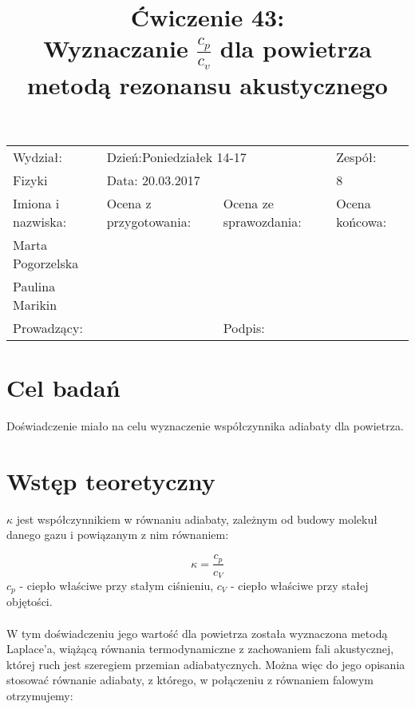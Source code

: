 \documentclass[a4paper,10pt]{article}
\def\arraystretch{1.2}
\begin{document}
\begin{table}
  \centering
  \def\arraystretch{1.5}
    \begin{tabular}{|l|l|l|l|} \hline
    Wydział:           & \multicolumn{2}{l|}{Dzień:Poniedziałek 14-17}    &Zespół:  \\
    Fizyki             &    \multicolumn{2}{l|}{Data: 20.03.2017}         &8             \\\hline
    Imiona i nazwiska: &Ocena z przygotowania:  &Ocena ze sprawozdania:   &Ocena końcowa: \\
    Marta Pogorzelska  &                        &                         &                \\
    Paulina Marikin    &                        &                         &\\\hline
    \multicolumn{2}{|l|}{Prowadzący:                 } &\multicolumn{2}{l|}{Podpis:             }  \\\hline
  \end{tabular}
\end{table}

\title{Ćwiczenie 43:\\Wyznaczanie $\frac{c_p}{c_v}$ dla powietrza metodą rezonansu akustycznego}
\date{}
\maketitle

\section{Cel badań}
Doświadczenie miało na celu wyznaczenie współczynnika adiabaty dla powietrza.

\section{Wstęp teoretyczny}
$\kappa$ jest współczynnikiem w równaniu adiabaty, zależnym od budowy molekuł danego gazu i powiązanym z nim równaniem:

\begin{equation}
  \kappa = \frac{c_p}{c_V}
\end{equation}
$c_p$ - ciepło właściwe przy stałym ciśnieniu, $c_V$ - ciepło właściwe przy stałej objętości.
\\\\W tym doświadczeniu jego wartość dla powietrza została wyznaczona metodą Laplace'a, wiążącą równania termodynamiczne z zachowaniem fali akustycznej,
której ruch jest szeregiem przemian adiabatycznych. Można więc do jego opisania stosować równanie adiabaty, z którego, w połączeniu z równaniem
falowym otrzymujemy:
\end{document}

